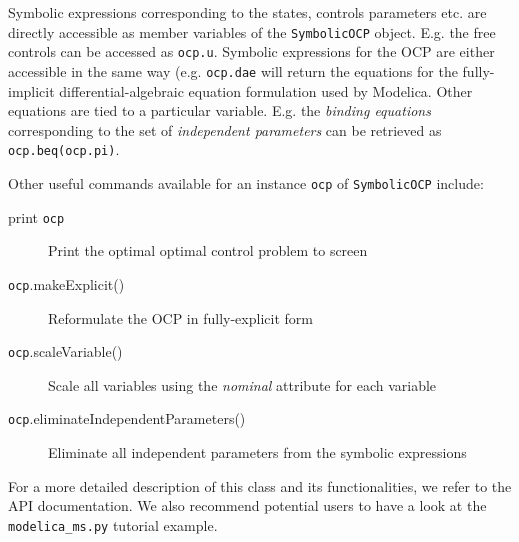 \documentclass[a4paper,12pt]{book}
\begin{document}
Symbolic expressions corresponding to the states, controls parameters etc. are directly accessible as member variables of the \texttt{SymbolicOCP} object. E.g. the free controls can be accessed as \verb|ocp.u|. Symbolic expressions for the OCP are either accessible in the same way (e.g. \verb|ocp.dae| will return the equations for the fully-implicit differential-algebraic equation formulation used by Modelica. Other equations are tied to a particular variable. E.g. the \emph{binding equations} corresponding to the set of \emph{independent parameters} can be retrieved as \verb|ocp.beq(ocp.pi)|. 

Other useful commands available for an instance \texttt{ocp} of \texttt{SymbolicOCP} include:
\begin{description}
\item[print \texttt{ocp}] Print the optimal optimal control problem to screen
\item[\texttt{ocp}.makeExplicit()] Reformulate the OCP in fully-explicit form
\item[\texttt{ocp}.scaleVariable()] Scale all variables using the \emph{nominal} attribute for each variable
\item[\texttt{ocp}.eliminateIndependentParameters()] Eliminate all independent parameters from the symbolic expressions
\end{description}

For a more detailed description of this class and its functionalities, we refer to the API documentation. We also recommend potential users to have a look at the {\texttt{modelica\_ms.py}} tutorial example.
\end{document}
